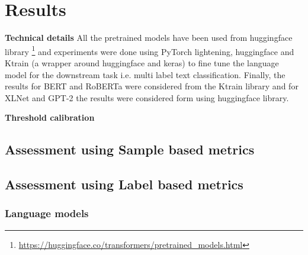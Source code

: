 \chapter{Results}

\textbf{Technical details}
All the pretrained models have been used from huggingface library \footnote{\url{https://huggingface.co/transformers/pretrained_models.html}} and experiments were done using PyTorch lightening, huggingface and Ktrain (a wrapper around huggingface and keras) to fine tune the language model for the downstream task i.e. multi label text classification. Finally, the results for BERT and RoBERTa were considered from the Ktrain library and for XLNet and GPT-2 the results were considered form using huggingface library.

\textbf{Threshold calibration}
\section {Assessment using Sample based metrics}
\section {Assessment using Label based metrics}

\subsection{Language models}
